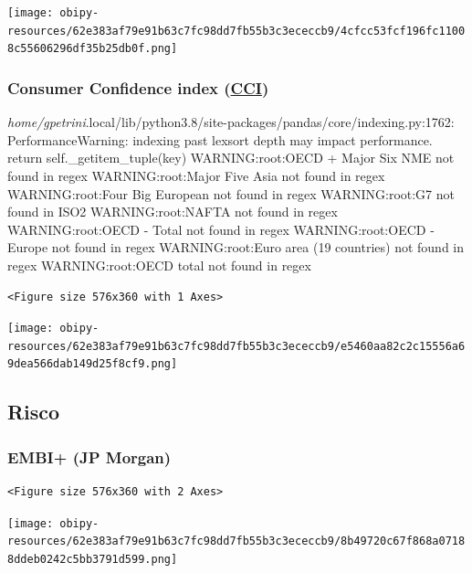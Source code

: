 \documentclass[11pt]{article}
\begin{document}
\begin{center}
\texttt{[image: obipy-resources/62e383af79e91b63c7fc98dd7fb55b3c3ececcb9/4cfcc53fcf196fc11008c55606296df35b25db0f.png]}
\end{center}


\subsubsection{Consumer Confidence index (\href{https://stats.oecd.org/Index.aspx?DataSetCode=MEI\_CCI}{CCI})}
\label{sec:org7bfb986}

\emph{home/gpetrini}.local/lib/python3.8/site-packages/pandas/core/indexing.py:1762: PerformanceWarning: indexing past lexsort depth may impact performance.
  return self.\_getitem\_tuple(key)
WARNING:root:OECD + Major Six NME not found in regex
WARNING:root:Major Five Asia not found in regex
WARNING:root:Four Big European not found in regex
WARNING:root:G7 not found in ISO2
WARNING:root:NAFTA not found in regex
WARNING:root:OECD - Total not found in regex
WARNING:root:OECD - Europe not found in regex
WARNING:root:Euro area (19 countries) not found in regex
WARNING:root:OECD total  not found in regex

\begin{verbatim}
<Figure size 576x360 with 1 Axes>
\end{verbatim}


\begin{center}
\texttt{[image: obipy-resources/62e383af79e91b63c7fc98dd7fb55b3c3ececcb9/e5460aa82c2c15556a69dea566dab149d25f8cf9.png]}
\end{center}

\subsection{Risco}
\label{sec:org3c5e8d2}

\subsubsection{EMBI+ (JP Morgan)}
\label{sec:orgae054b2}

\begin{verbatim}
<Figure size 576x360 with 2 Axes>
\end{verbatim}


\begin{center}
\texttt{[image: obipy-resources/62e383af79e91b63c7fc98dd7fb55b3c3ececcb9/8b49720c67f868a07188ddeb0242c5bb3791d599.png]}
\end{center}
\end{document}
